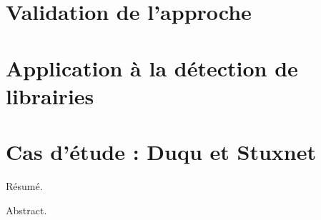 \documentclass[11pt]{TUL/thesul}
\begin{document}
\DontFrameThisInToc
\chapter{Validation de l'approche}

\DontFrameThisInToc
\chapter{Application à la détection de librairies}

\DontFrameThisInToc
\chapter{Cas d'étude : Duqu et Stuxnet}

\PutLineInToc

\PrintIndex

\onecolumn



\nocite{*}




\NumberAbstractPages
\begin{ThesisAbstract}
  \begin{FrenchAbstract}
    Résumé.
  \end{FrenchAbstract}
  \begin{EnglishAbstract}
    Abstract.
  \end{EnglishAbstract}
\end{ThesisAbstract}
\end{document}
